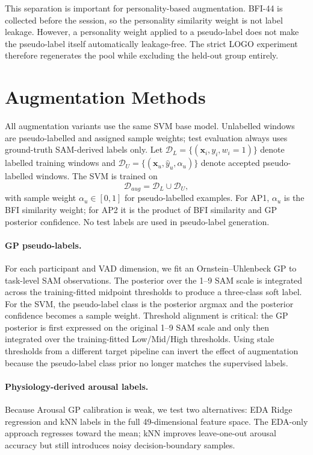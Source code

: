 \documentclass[sigconf,review,anonymous]{acmart}
\begin{document}
This separation is important for personality-based augmentation.
BFI-44 is collected before the session, so the personality similarity weight is
not label leakage.
However, a personality weight applied to a pseudo-label does not make the
pseudo-label itself automatically leakage-free.
The strict LOGO experiment therefore regenerates the pool while excluding the
held-out group entirely.

\section{Augmentation Methods}
\label{sec:methods}

All augmentation variants use the same SVM base model.
Unlabelled windows are pseudo-labelled and assigned sample weights; test
evaluation always uses ground-truth SAM-derived labels only.
Let $\mathcal{D}_{L}=\{(\mathbf{x}_i,y_i,w_i=1)\}$ denote labelled training
windows and $\mathcal{D}_{U}=\{(\mathbf{x}_u,\hat{y}_u,\alpha_u)\}$ denote
accepted pseudo-labelled windows.
The SVM is trained on
\begin{equation}
  \mathcal{D}_{aug} = \mathcal{D}_{L} \cup \mathcal{D}_{U},
\end{equation}
with sample weight $\alpha_u \in [0,1]$ for pseudo-labelled examples.
For AP1, $\alpha_u$ is the BFI similarity weight; for AP2 it is the product of
BFI similarity and GP posterior confidence.
No test labels are used in pseudo-label generation.

\paragraph{GP pseudo-labels.}
For each participant and VAD dimension, we fit an Ornstein--Uhlenbeck GP to
task-level SAM observations.
The posterior over the 1--9 SAM scale is integrated across the
training-fitted midpoint thresholds to produce a three-class soft label.
For the SVM, the pseudo-label class is the posterior argmax and the
posterior confidence becomes a sample weight.
Threshold alignment is critical: the GP posterior is first expressed on the
original 1--9 SAM scale and only then integrated over the training-fitted
Low/Mid/High thresholds.
Using stale thresholds from a different target pipeline can invert the effect
of augmentation because the pseudo-label class prior no longer matches the
supervised labels.

\paragraph{Physiology-derived arousal labels.}
Because Arousal GP calibration is weak, we test two alternatives:
EDA Ridge regression and kNN labels in the full 49-dimensional feature space.
The EDA-only approach regresses toward the mean; kNN improves leave-one-out
arousal accuracy but still introduces noisy decision-boundary samples.
\end{document}
